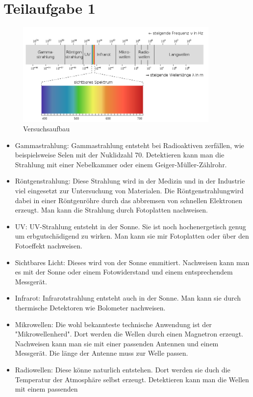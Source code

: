 

\section{Teilaufgabe 1}


\begin{figure}[h]
    \begin{center}
        \includegraphics[width=10cm]{Bilder/Emspekt.PNG}
    \end{center}
    \caption{Versuchsaufbau}
   \end{figure}

\begin{itemize}
    \item Gammastrahlung: Gammastrahlung entsteht bei Radioaktiven zerfällen, wie beispielsweise Selen mit der Nuklidzahl 70. Detektieren kann man die Strahlung mit einer Nebelkammer oder einem Geiger-Müller-Zählrohr.
    \item Röntgenstrahlung: Diese Strahlung wird in der Medizin und in der Industrie viel eingesetzt zur Untersuchung von Materialen. Die Röntgenstrahlungwird dabei in einer Röntgenröhre durch das abbremsen von schnellen Elektronen erzeugt. Man kann die Strahlung durch Fotoplatten nachweisen.
    \item UV: UV-Strahlung entsteht in der Sonne. Sie ist noch hochenergetisch genug um erbgutschädigend zu wirken. Man kann sie mir Fotoplatten oder über den Fotoeffekt nachweisen.
    \item Sichtbares Licht: Dieses wird von der Sonne emmitiert. Nachweisen kann man es mit der Sonne oder einem Fotowiderstand und einem entsprechendem Messgerät.
    \item Infrarot: Infrarotstrahlung entsteht auch in der Sonne. Man kann sie durch thermische Detektoren wie Bolometer nachweisen.
    \item Mikrowellen: Die wohl bekannteste technische Anwendung ist der "Mikrowellenherd". Dort werden die Wellen durch einen Magnetron erzeugt. Nachweisen kann man sie mit einer passenden Antennen und einem Messgerät. Die länge der Antenne muss zur Welle passen.
    \item Radiowellen: Diese könne naturlich entstehen. Dort werden sie duch die Temperatur der Atmosphäre selbst erzeugt. Detektieren kann man die Wellen mit einem passenden 
\end{itemize}
